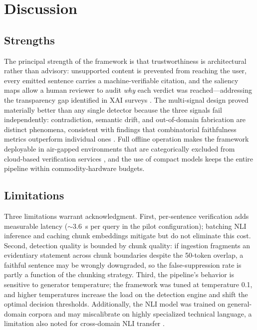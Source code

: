 \documentclass[journal]{IEEEtran}
\begin{document}
\section{Discussion}

\subsection{Strengths}
The principal strength of the framework is that trustworthiness is
architectural rather than advisory: unsupported content is prevented from
reaching the user, every emitted sentence carries a machine-verifiable
citation, and the saliency maps allow a human reviewer to audit \emph{why}
each verdict was reached---addressing the transparency gap identified in XAI
surveys \cite{minaee2024xai}. The multi-signal design proved materially
better than any single detector because the three signals fail
independently: contradiction, semantic drift, and out-of-domain fabrication
are distinct phenomena, consistent with findings that combinatorial
faithfulness metrics outperform individual ones \cite{malin2025faithfulness}.
Full offline operation makes the framework deployable in air-gapped
environments that are categorically excluded from cloud-based verification
services \cite{es2024ragas,liu2023geval}, and the use of compact models
keeps the entire pipeline within commodity-hardware budgets.

\subsection{Limitations}
Three limitations warrant acknowledgment. First, per-sentence verification
adds measurable latency ($\sim$3.6~s per query in the pilot configuration);
batching NLI inference and caching chunk embeddings mitigate but do not
eliminate this cost. Second, detection quality is bounded by chunk quality:
if ingestion fragments an evidentiary statement across chunk boundaries
despite the 50-token overlap, a faithful sentence may be wrongly downgraded,
so the false-suppression rate is partly a function of the chunking strategy.
Third, the pipeline's behavior is sensitive to generator temperature; the
framework was tuned at temperature 0.1, and higher temperatures increase the
load on the detection engine and shift the optimal decision thresholds.
Additionally, the NLI model was trained on general-domain corpora and may
miscalibrate on highly specialized technical language, a limitation also
noted for cross-domain NLI transfer
\cite{laban2022summac,shwartz2024crosslingual}.
\end{document}
